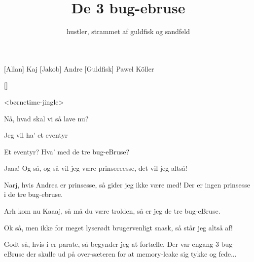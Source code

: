 \documentclass[a4paper,11pt]{article}
\title{De 3 bug-ebruse}
\author{hustler, strammet af guldfisk og sandfeld}
\begin{document}
\maketitle

\begin{roles}
[Allan] Kaj
[Jakob] Andre
[Guldfisk] Pawel Köller
\end{roles}

\begin{props}
[]
\end{props}

  
\begin{sketch}

   <børnetime-jingle>
% 
% 
% 
% 

   Nå, hvad skal vi så lave nu?

   Jeg vil ha' et eventyr

   Et eventyr? Hva' med de tre bug-eBruse?

   Jaaa! Og så, og så vil jeg være prinseeeesse, det vil jeg altså!

% 
% 

   Narj, hvis Andrea er prinsesse, så gider jeg ikke være med!
  Der er ingen prinsesse i de tre bug-ebruse.

   Arh kom nu Kaaaj, så må du være trolden, så er jeg de tre bug-eBruse.

   Ok så, men ikke for meget lyserødt brugervenligt snask, så står jeg
  altså af!

   Godt så, hvis i er parate, så begynder jeg at fortælle.   Der var engang 3 bug-eBruse der skulle ud på
  over-sæteren for at memory-leake sig tykke og fede...

% 
% 


\end{sketch}
\end{document}
